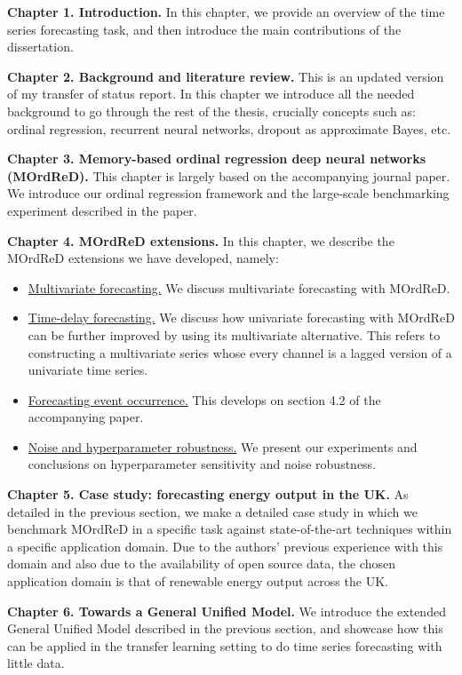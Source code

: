 \documentclass[pdftex,12pt,a4paper]{article}
\theoremstyle{definition}
\theoremstyle{remark}
\begin{document}
\textbf{Chapter 1. Introduction.} In this chapter, we provide an overview of the time series forecasting task, and then introduce the main contributions of the dissertation.

\textbf{Chapter 2. Background and literature review.} This is an updated version of my transfer of status report. In this chapter we introduce all the needed background to go through the rest of the thesis, crucially concepts such as: ordinal regression, recurrent neural networks, dropout as approximate Bayes, etc.

\textbf{Chapter 3. Memory-based ordinal regression deep neural networks (MOrdReD).} This chapter is largely based on the accompanying journal paper. We introduce our ordinal regression framework and the large-scale benchmarking experiment described in the paper.

\textbf{Chapter 4. MOrdReD extensions.} In this chapter, we describe the MOrdReD extensions we have developed, namely: 
\begin{itemize}
    \item \underline{Multivariate forecasting.} We discuss multivariate forecasting with MOrdReD.
    \item \underline{Time-delay forecasting.} We discuss how univariate forecasting with MOrdReD can be further improved by using its multivariate alternative. This refers to constructing a multivariate series whose every channel is a lagged version of a univariate time series.
    \item \underline{Forecasting event occurrence.} This develops on section 4.2 of the accompanying paper.
    \item \underline{Noise and hyperparameter robustness.} We present our experiments and conclusions on hyperparameter sensitivity and noise robustness.
\end{itemize}

\textbf{Chapter 5. Case study: forecasting energy output in the UK.} As detailed in the previous section, we make a detailed case study in which we benchmark MOrdReD in a specific task against state-of-the-art techniques within a specific application domain. Due to the authors' previous experience with this domain and also due to the availability of open source data, the chosen application domain is that of renewable energy output across the UK.

\textbf{Chapter 6. Towards a General Unified Model.} We introduce the extended General Unified Model described in the previous section, and showcase how this can be applied in the transfer learning setting to do time series forecasting with little data.
\end{document}
